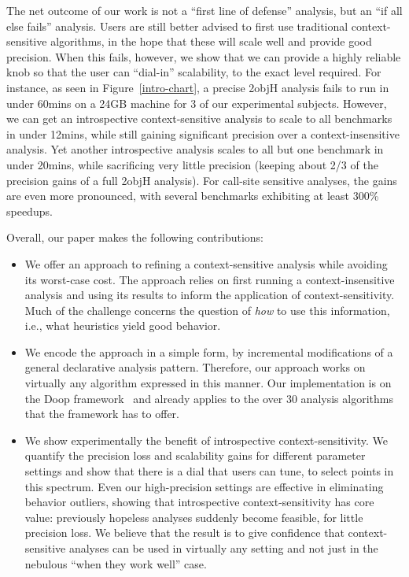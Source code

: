 The net outcome of our work is not a ``first line of defense''
analysis, but an ``if all else fails'' analysis. Users are still
better advised to first use traditional context-sensitive algorithms,
in the hope that these will scale well and provide good
precision. When this fails, however, we show that we can provide a
highly reliable knob 
so that the user can ``dial-in'' scalability, to the exact level
required. For instance, as seen in Figure~\ref{intro-chart}, a precise
2objH analysis fails to run in under 60mins on a 24GB machine for 3 of
our experimental subjects. However, we can get an introspective
context-sensitive analysis to scale to all benchmarks in under 12mins,
while still gaining significant precision over a context-insensitive
analysis. Yet another introspective analysis scales to all but one
benchmark in under 20mins, while sacrificing very little precision
(keeping about 2/3 of the precision gains of a full 2objH analysis).
For call-site sensitive analyses, the gains are even more pronounced,
with several benchmarks exhibiting at least 300\% speedups.

Overall, our paper makes the following contributions:

\begin{itemize}
\item We offer an approach to refining a context-sensitive analysis
  while avoiding its worst-case cost. The approach relies on first
  running a context-insensitive analysis and using its results to
  inform the application of context-sensitivity. Much of the challenge
  concerns the question of \emph{how} to use this information, i.e., 
  what heuristics yield good behavior.

\item We encode the approach in a simple form, by incremental modifications
  of a general declarative analysis pattern. Therefore, our approach
  works on virtually any algorithm expressed in this manner. Our
  implementation is on the Doop framework~\cite{oopsla:2009:Bravenboer} and already
  applies to the over 30 analysis algorithms that the framework has to offer.

\item We show experimentally the benefit of introspective
  context-sensitivity. We quantify the precision loss and scalability
  gains for different parameter settings and show that there is a dial
  that users can tune, to select points in this spectrum. Even our
  high-precision settings are effective in eliminating behavior outliers,
  showing that introspective context-sensitivity has core value:
  previously hopeless analyses suddenly become feasible, for little
  precision loss. We believe that the result is to give confidence
  that context-sensitive analyses can be used in virtually any setting
  and not just in the nebulous ``when they work well'' case.

\end{itemize}



